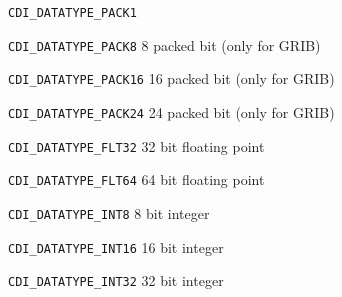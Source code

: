 \vspace*{3mm}
\hspace*{8mm}\begin{minipage}{15cm}
\begin{deflist}{{\large\tt CDI\_DATATYPE\_PACK1 \ \ }}
\item[{\large\tt CDI\_DATATYPE\_PACK8}]    8 packed bit (only for GRIB)
\item[{\large\tt CDI\_DATATYPE\_PACK16}]  16 packed bit (only for GRIB)
\item[{\large\tt CDI\_DATATYPE\_PACK24}]  24 packed bit (only for GRIB)
\item[{\large\tt CDI\_DATATYPE\_FLT32}]   32 bit floating point
\item[{\large\tt CDI\_DATATYPE\_FLT64}]   64 bit floating point
\item[{\large\tt CDI\_DATATYPE\_INT8}]     8 bit integer
\item[{\large\tt CDI\_DATATYPE\_INT16}]   16 bit integer
\item[{\large\tt CDI\_DATATYPE\_INT32}]   32 bit integer
\end{deflist}
\end{minipage}
%
%

